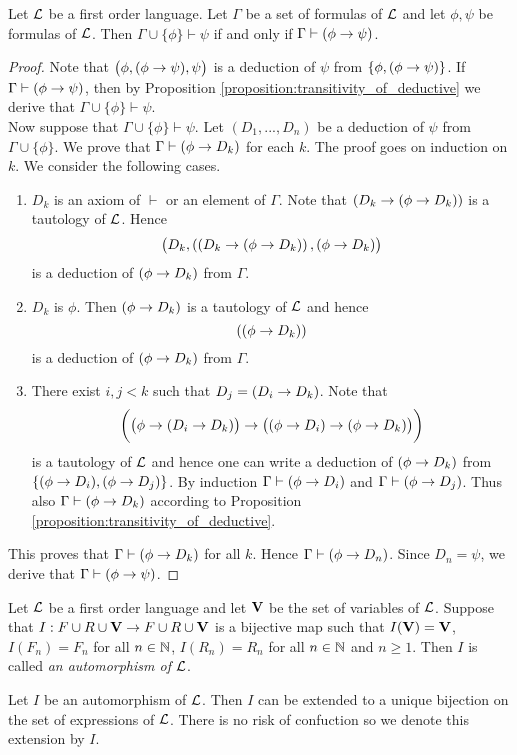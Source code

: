 \begin{theorem}\label{theorem:deduction_theorem}
Let ${\mathcal L}$ be a first order language. Let $\Gamma$ be a set of formulas of ${\mathcal L}$ and let $\phi, \psi$ be formulas of ${\mathcal L}$. Then $\Gamma \cup \{\phi\} \vdash \psi$ if and only if $\Gamma \vdash (\phi \rightarrow \psi)$.
\end{theorem}
\begin{proof}
Note that $\big(\phi, (\phi \rightarrow \psi) , \psi\big)$ is a deduction of $\psi$ from $\{\phi, (\phi \rightarrow \psi)\}$. If $\Gamma \vdash (\phi \rightarrow \psi)$, then by Proposition \ref{proposition:transitivity_of_deductive} we derive that $\Gamma \cup \{\phi\} \vdash \psi$.\\
Now suppose that $\Gamma \cup \{\phi\} \vdash \psi$. Let $(D_1 , ..., D_n)$ be a deduction of $\psi$ from $\Gamma \cup \{\phi\}$. We prove that $\Gamma \vdash (\phi \rightarrow D_k)$ for each $k$. The proof goes on induction on $k$. We consider the following cases.
\begin{enumerate}[label=\textbf{(\arabic*)}, leftmargin=3.0em]
\item $D_k$ is an axiom of $\vdash$ or an element of $\Gamma$. Note that $\left(D_k \rightarrow (\phi \rightarrow D_k )\right)$ is a tautology of ${\mathcal L}$. Hence
$$\big(D_k,\left((D_k \rightarrow (\phi \rightarrow D_k )\right),(\phi \rightarrow D_k )\big)$$
is a deduction of $(\phi \rightarrow D_k)$ from $\Gamma$.
\item $D_k$ is $\phi$. Then $(\phi \rightarrow D_k)$ is a tautology of ${\mathcal L}$ and hence
$$\left((\phi \rightarrow D_k )\right)$$
is a deduction of $(\phi \rightarrow D_k)$ from $\Gamma$.
\item There exist $i, j < k$ such that $D_j = (D_i \rightarrow D_k)$. Note that
$$\bigg(\big(\phi \rightarrow (D_i \rightarrow D_k)\big) \rightarrow \big((\phi \rightarrow D_i ) \rightarrow (\phi \rightarrow D_k)\big)\bigg)$$
is a tautology of ${\mathcal L}$ and hence one can write a deduction of $(\phi \rightarrow D_k)$ from $\{(\phi \rightarrow D_i),(\phi \rightarrow D_j)\}$. By induction $\Gamma \vdash (\phi \rightarrow D_i)$ and $\Gamma \vdash (\phi \rightarrow D_j)$. Thus also $\Gamma \vdash (\phi \rightarrow D_k)$ according to Proposition \ref{proposition:transitivity_of_deductive}.
\end{enumerate}
This proves that $\Gamma \vdash (\phi \rightarrow D_k)$ for all $k$. Hence $\Gamma \vdash (\phi \rightarrow D_n)$. Since $D_n = \psi$, we derive that $\Gamma \vdash (\phi \rightarrow \psi)$.
\end{proof}


\begin{definition}
Let ${\mathcal L}$ be a first order language and let $\mathbf{V}$ be the set of variables of ${\mathcal L}$. Suppose that $I:F\cup R \cup \mathbf{V}\rightarrow F \cup R \cup \mathbf{V}$ is a bijective map such that $I(\mathbf{V}) = \mathbf{V}$, $I(F_n) = F_n$ for all $n \in {\mathbb N}$, $I(R_n) = R_n$ for all $n \in {\mathbb N}$ and $n \geq 1$. Then $I$ is called \textit{an automorphism of ${\mathcal L}$}.
\end{definition}
\noindent
Let $I$ be an automorphism of ${\mathcal L}$. Then $I$ can be extended to a unique bijection on the set of expressions of ${\mathcal L}$. There is no risk of confuction so we denote this extension by $I$.

